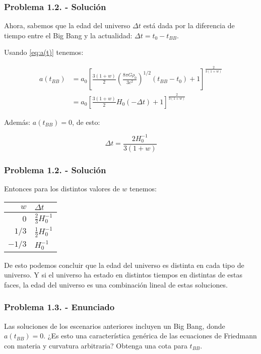 \begin{frame}
    \frametitle{Problema 1.2. - Solución}

    Ahora, sabemos que la edad del universo $\Delta t$ está dada por la diferencia de tiempo entre el Big Bang y la actualidad: $\Delta t = t_0-t_{BB}$.

    Usando \ref{eq:a(t)} tenemos:

    \begin{align*}
        a(t_{BB}) &= a_0\left[\frac{3\left(1+w\right)}{2}\left(\frac{8\pi G \rho_0}{3c^2}\right)^{1/2}\left(t_{BB}-t_0\right)+1\right]^{\frac{2}{3\left(1+w\right)}}\\
        &=a_0\left[\frac{3\left(1+w\right)}{2}H_0\left(-\Delta t\right)+1\right]^{\frac{2}{3\left(1+w\right)}}
    \end{align*}

    Además: $a(t_{BB}) = 0$, de esto:

    \begin{equation}
        \Delta t = \frac{2H_0^{-1}}{3(1+w)}
        \label{eq:Deltat}
    \end{equation}
\end{frame}

\begin{frame}
    \frametitle{Problema 1.2. - Solución}

    Entonces para los distintos valores de $w$ tenemos:

    \begin{table}
        \centering
        \begin{tabular}{rl}
            $w$ & $\Delta t$\\\hline
            $0$ & $\frac{2}{3}H_0^{-1}$\\
            $1/3$ & $\frac{1}{2}H_0^{-1}$\\
            $-1/3$ & $H_0^{-1}$\\
        \end{tabular}
    \end{table}
    
    De esto podemos concluir que la edad del universo es distinta en cada tipo de universo. Y si el universo ha estado en distintos tiempos en distintas de estas faces, la edad del universo es una combinación lineal de estas soluciones.
\end{frame}

\begin{frame}
    \frametitle{Problema 1.3. - Enunciado}

    Las soluciones de los escenarios anteriores incluyen un Big Bang, donde $a(t_{BB})=0$. ¿Es esto una característica genérica de las ecuaciones de Friedmann con materia y curvatura arbitraria? Obtenga una cota para $t_{BB}$.

\end{frame}


